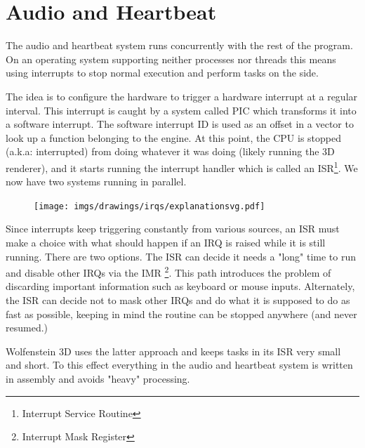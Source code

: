 \section{Audio and Heartbeat} 
\label{audio_and_heartbeat}
The audio and heartbeat system runs concurrently with the rest of the program. On an operating system supporting neither processes nor threads this means using interrupts to stop normal execution and perform tasks on the side.\\
\par
The idea is to configure the hardware to trigger a hardware interrupt at a regular interval. This interrupt is caught by a system called PIC which transforms it into a software interrupt. The software interrupt ID is used as an offset in a vector to look up a function belonging to the engine. At this point, the CPU is stopped (a.k.a: interrupted) from doing whatever it was doing (likely running the 3D renderer), and it starts running the interrupt handler which is called an ISR\footnote{Interrupt Service Routine}. We now have two systems running in parallel.\\
\par
\begin{figure}[H]
\centering
\texttt{[image: imgs/drawings/irqs/explanationsvg.pdf]}
 \end{figure}
\par
\par
 Since interrupts keep triggering constantly from various sources, an ISR must make a choice with what should happen if an IRQ is raised while it is still running. There are two options.  The ISR can decide it needs a "long" time to run and disable other IRQs via the IMR \footnote{Interrupt Mask Register}. This path introduces the problem of discarding important information such as keyboard or mouse inputs. Alternately, the ISR can decide not to mask other IRQs and do what it is supposed to do as fast as possible, keeping in mind the routine can be stopped anywhere (and never resumed.)\\
 \par
 Wolfenstein 3D uses the latter approach and keeps tasks in its ISR very small and short. To this effect everything in the audio and heartbeat system is written in assembly and avoids "heavy" processing.

